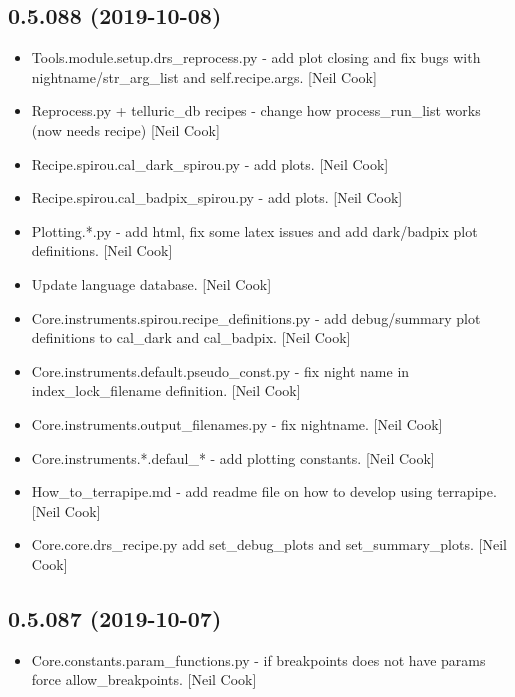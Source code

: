 \documentclass[a4paper,10pt,english]{report}
\begin{document}
\subsection{0.5.088 (2019-10-08)}
\label{\detokenize{misc/changelog:id53}}\begin{itemize}
\item {} 
Tools.module.setup.drs\_reprocess.py - add plot closing and fix bugs
with nightname/str\_arg\_list and self.recipe.args. {[}Neil Cook{]}

\item {} 
Reprocess.py + telluric\_db recipes - change how process\_run\_list works
(now needs recipe) {[}Neil Cook{]}

\item {} 
Recipe.spirou.cal\_dark\_spirou.py - add plots. {[}Neil Cook{]}

\item {} 
Recipe.spirou.cal\_badpix\_spirou.py - add plots. {[}Neil Cook{]}

\item {} 
Plotting.*.py - add html, fix some latex issues and add dark/badpix
plot definitions. {[}Neil Cook{]}

\item {} 
Update language database. {[}Neil Cook{]}

\item {} 
Core.instruments.spirou.recipe\_definitions.py - add debug/summary plot
definitions to cal\_dark and cal\_badpix. {[}Neil Cook{]}

\item {} 
Core.instruments.default.pseudo\_const.py - fix night name in
index\_lock\_filename definition. {[}Neil Cook{]}

\item {} 
Core.instruments.output\_filenames.py - fix nightname. {[}Neil Cook{]}

\item {} 
Core.instruments.*.defaul\_* - add plotting constants. {[}Neil Cook{]}

\item {} 
How\_to\_terrapipe.md - add readme file on how to develop using
terrapipe. {[}Neil Cook{]}

\item {} 
Core.core.drs\_recipe.py add set\_debug\_plots and set\_summary\_plots.
{[}Neil Cook{]}

\end{itemize}


\subsection{0.5.087 (2019-10-07)}
\label{\detokenize{misc/changelog:id54}}\begin{itemize}
\item {} 
Core.constants.param\_functions.py - if breakpoints does not have
params force allow\_breakpoints. {[}Neil Cook{]}

\end{itemize}
\end{document}
